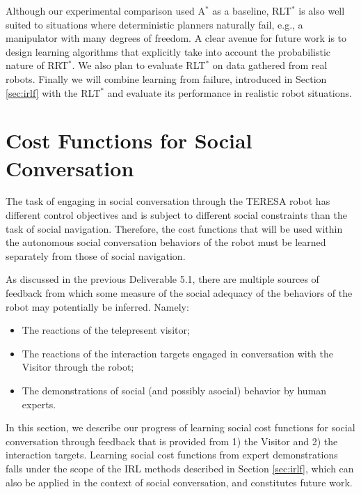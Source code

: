 \documentclass[a4paper,11pt]{report}
\begin{document}
 Although our experimental comparison used A$^*$ as a baseline, RLT$^*$ is also well suited to situations where deterministic planners naturally fail, e.g., a manipulator with many degrees of freedom. A clear avenue for future work is to design learning algorithms that explicitly take into account the probabilistic nature of RRT$^*$. We also plan to evaluate RLT$^*$ on data gathered from real robots. Finally we will combine learning from failure, introduced in Section \ref{sec:irlf} with the RLT$^*$ and evaluate its performance in realistic robot situations.

\clearpage

\section{Cost Functions for Social Conversation}
\label{sec:cost_functions}

The task of engaging in social conversation through the TERESA robot has different control objectives and is subject to different social constraints than the task of social navigation. Therefore, the cost functions that will be used within the autonomous social conversation behaviors of the robot must be learned separately from those of social navigation.

As discussed in the previous Deliverable 5.1, there are multiple sources of feedback from which some measure of the social adequacy of the behaviors of the robot may potentially be inferred. Namely:
\begin{itemize}
\item The reactions of the telepresent visitor;
\item The reactions of the interaction targets engaged in conversation with the Visitor through the robot;
\item The demonstrations of social (and possibly asocial) behavior by human experts. 
\end{itemize}

In this section, we describe our progress of learning social cost functions for social conversation through feedback that is provided from 1) the Visitor and 2) the interaction targets. Learning social cost functions from expert demonstrations falls under the scope of the IRL methods described in Section \ref{sec:irlf}, which can also be applied in the context of social conversation, and constitutes future work.
\end{document}
